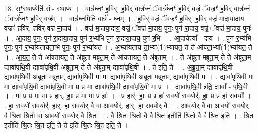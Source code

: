 \documentclass[17pt]{extarticle}
\begin{document}
18. सꣳ॒॒स्थाप्येति॑ सं - स्थाप्य॑ । . वार्त्र॑घ्नꣳ ह॒विर्. ह॒विर् वार्त्र॑घ्नं॒ ॅवार्त्र॑घ्नꣳ ह॒विर् वज्रं॒ ॅवज्रꣳ॑ ह॒विर् वार्त्र॑घ्नं॒ ॅवार्त्र॑घ्नꣳ ह॒विर् वज्र᳚म् । . वार्त्र॑घ्न॒मिति॒ वार्त्र॑ - घ्न॒म् । . ह॒विर् वज्रं॒ ॅवज्रꣳ॑ ह॒विर्. ह॒विर् वज्र॑ मा॒दाया॒दाय॒ वज्रꣳ॑ ह॒विर्. ह॒विर् वज्र॑ मा॒दाय॑ । . वज्र॑ मा॒दाया॒दाय॒ वज्रं॒ ॅवज्र॑ मा॒दाय॒ पुनः॒ पुन॑ रा॒दाय॒ वज्रं॒ ॅवज्र॑ मा॒दाय॒ पुनः॑ । . आ॒दाय॒ पुनः॒ पुन॑ रा॒दाया॒दाय॒ पुन॑ र॒भ्य॑भि पुन॑ रा॒दाया॒दाय॒ पुन॑ र॒भि । . आ॒दायेत्या᳚ - दाय॑ । . पुन॑ र॒भ्य॑भि पुनः॒ पुन॑ र॒भ्या॑यतायता॒भि पुनः॒ पुन॑ र॒भ्या॑यत । . अ॒भ्या॑यताय ता॒भ्या᳚(1॒)भ्या॑यत॒ ते ते आ॑यता॒भ्या᳚(1॒)भ्या॑यत॒ ते । . आ॒य॒त॒ ते ते आ॑यतायत॒ ते अ॑ब्रूता मब्रूता॒म् ते आ॑यतायत॒ ते अ॑ब्रूताम् । . ते अ॑ब्रूता मब्रूता॒म् ते ते अ॑ब्रूता॒म् द्यावा॑पृथि॒वी द्यावा॑पृथि॒वी अ॑ब्रूता॒म् ते ते अ॑ब्रूता॒म् द्यावा॑पृथि॒वी । . ते इति॒ ते । . अ॒ब्रू॒ता॒म् द्यावा॑पृथि॒वी द्यावा॑पृथि॒वी अ॑ब्रूता मब्रूता॒म् द्यावा॑पृथि॒वी मा मा द्यावा॑पृथि॒वी अ॑ब्रूता मब्रूता॒म् द्यावा॑पृथि॒वी मा । . द्यावा॑पृथि॒वी मा मा द्यावा॑पृथि॒वी द्यावा॑पृथि॒वी मा प्र प्र मा द्यावा॑पृथि॒वी द्यावा॑पृथि॒वी मा प्र । . द्यावा॑पृथि॒वी इति॒ द्यावा᳚ - पृ॒थि॒वी । . मा प्र प्र मा मा प्र हार्॑. हाः॒ प्र मा मा प्र हाः᳚ । . प्र हार्॑. हाः॒ प्र प्र हा॑ रा॒वयो॑ रा॒वयोर्॑. हाः॒ प्र प्र हा॑ रा॒वयोः᳚ । . हा॒ रा॒वयो॑ रा॒वयोर्॑. हार्. हा रा॒वयो॒र् वै वा आ॒वयोर्॑. हार्. हा रा॒वयो॒र् वै । . आ॒वयो॒र् वै वा आ॒वयो॑ रा॒वयो॒र् वै श्रि॒तः श्रि॒तो वा आ॒वयो॑ रा॒वयो॒र् वै श्रि॒तः । . वै श्रि॒तः श्रि॒तो वै वै श्रि॒त इतीति॑ श्रि॒तो वै वै श्रि॒त इति॑ । . श्रि॒त इतीति॑ श्रि॒तः श्रि॒त इति॒ ते ते इति॑ श्रि॒तः श्रि॒त इति॒ ते । \newline
\end{document}
